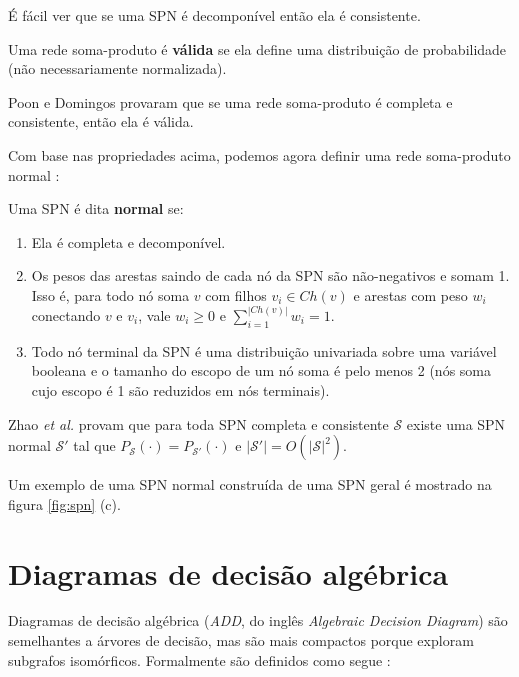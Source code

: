 É fácil ver que se uma SPN é decomponível então ela é consistente.

\begin{definition}
  Uma rede soma-produto é \textbf{válida} se ela define uma distribuição de probabilidade (não necessariamente normalizada).
\end{definition}

Poon e Domingos provaram \cite{Poon2012} que se uma rede soma-produto é completa e consistente, então ela é válida.

Com base nas propriedades acima, podemos agora definir uma rede soma-produto normal \cite{Zhao2015}:

\begin{definition}
  Uma SPN é dita \textbf{normal} se:

  \begin{enumerate}
    \item Ela é completa e decomponível.
    \item Os pesos das arestas saindo de cada nó da SPN são não-negativos e somam 1. Isso é, para todo nó soma $v$ com filhos $v_i \in Ch(v)$ e arestas com peso $w_i$ conectando $v$ e $v_i$, vale $w_i \geq 0$ e $\sum_{i=1}^{|Ch(v)|} w_i = 1$.
    \item Todo nó terminal da SPN é uma distribuição univariada sobre uma variável booleana e o tamanho do escopo de um nó soma é pelo menos 2 (nós soma cujo escopo é 1 são reduzidos em nós terminais).
  \end{enumerate}
\end{definition}

Zhao \emph{et al.} \cite{Zhao2015} provam que para toda SPN completa e consistente $\mathcal{S}$ existe uma SPN normal $\mathcal{S}'$ tal que $P_{\mathcal{S}}(\cdot) = P_{\mathcal{S}'}(\cdot)$ e $|\mathcal{S}'| = O(|\mathcal{S}|^2)$.

Um exemplo de uma SPN normal construída de uma SPN geral é mostrado na figura \ref{fig:spn} (c).

\section{Diagramas de decisão algébrica}

Diagramas de decisão algébrica (\emph{ADD}, do inglês \emph{Algebraic Decision Diagram}) são semelhantes a árvores de decisão, mas são mais compactos porque exploram subgrafos isomórficos. Formalmente são definidos como segue \cite{Bahar1993}:

